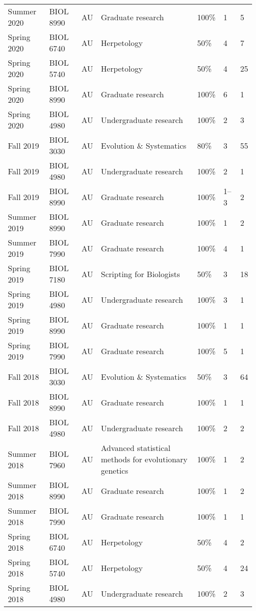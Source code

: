 {\begin{longtable}[l]{ p{0.79in} p{0.65in} p{0.60in} p{1.7in} p{0.58in} p{0.34in} p{0.70in} }
    Summer 2020 & BIOL 8990 & AU & Graduate research & 100\% & 1 & 5 \\ 
    Spring 2020 & BIOL 6740 & AU & Herpetology & 50\% & 4 & 7 \\
    Spring 2020 & BIOL 5740 & AU & Herpetology & 50\% & 4 & 25 \\
    Spring 2020 & BIOL 8990 & AU & Graduate research & 100\% & 6 & 1 \\ 
    Spring 2020 & BIOL 4980 & AU & Undergraduate research & 100\% & 2 & 3 \\ 
    Fall 2019 & BIOL 3030 & AU & Evolution \& Systematics & 80\% & 3 & 55 \\
    Fall 2019 & BIOL 4980 & AU & Undergraduate research & 100\% & 2 & 1 \\ 
    Fall 2019 & BIOL 8990 & AU & Graduate research & 100\% & 1--3 & 2 \\ 
    Summer 2019 & BIOL 8990 & AU & Graduate research & 100\% & 1 & 2 \\ 
    Summer 2019 & BIOL 7990 & AU & Graduate research & 100\% & 4 & 1 \\ 
    Spring 2019 & BIOL 7180 & AU & Scripting for Biologists & 50\% & 3 & 18 \\
    Spring 2019 & BIOL 4980 & AU & Undergraduate research & 100\% & 3 & 1 \\ 
    Spring 2019 & BIOL 8990 & AU & Graduate research & 100\% & 1 & 1 \\ 
    Spring 2019 & BIOL 7990 & AU & Graduate research & 100\% & 5 & 1 \\ 
    Fall 2018 & BIOL 3030 & AU & Evolution \& Systematics & 50\% & 3 & 64 \\
    Fall 2018 & BIOL 8990 & AU & Graduate research & 100\% & 1 & 1 \\ 
    Fall 2018 & BIOL 4980 & AU & Undergraduate research & 100\% & 2 & 2 \\ 
    Summer 2018 & BIOL 7960 & AU & Advanced statistical methods for evolutionary genetics & 100\% & 1 & 2 \\
    Summer 2018 & BIOL 8990 & AU & Graduate research & 100\% & 1 & 2 \\ 
    Summer 2018 & BIOL 7990 & AU & Graduate research & 100\% & 1 & 1 \\ 
    Spring 2018 & BIOL 6740 & AU & Herpetology & 50\% & 4 & 2 \\
    Spring 2018 & BIOL 5740 & AU & Herpetology & 50\% & 4 & 24 \\
    Spring 2018 & BIOL 4980 & AU & Undergraduate research & 100\% & 2 & 3 \\ 

\end{longtable}}
